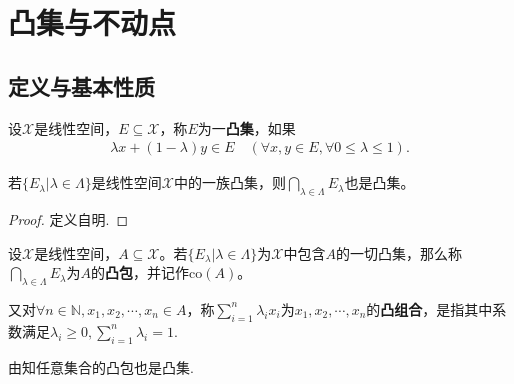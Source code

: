 \documentclass[../../main.tex]{subfiles}%
\begin{document}
\section{凸集与不动点}

\subsection{定义与基本性质}

\begin{definition}
设$\mathscr{X}$是线性空间，$E \subseteq \mathscr{X}$，称$E$为一\textbf{凸集}，如果
\begin{align*}
\lambda x + (1 - \lambda) y \in E \quad (\forall x, y \in E, \forall 0 \leqslant \lambda \leqslant 1).
\end{align*}
\end{definition}

\begin{proposition}\label{proposition:凸集任意交仍是凸集}
若$\{E_\lambda | \lambda \in \Lambda\}$是线性空间$\mathscr{X}$中的一族凸集，则$\bigcap\limits_{\lambda \in \Lambda} E_\lambda$也是凸集。
\end{proposition}
\begin{proof}
定义自明.
\end{proof}

\begin{definition}
设$\mathscr{X}$是线性空间，$A \subseteq \mathscr{X}$。若$\{E_\lambda | \lambda \in \Lambda\}$为$\mathscr{X}$中包含$A$的一切凸集，那么称$\bigcap\limits_{\lambda \in \Lambda} E_\lambda$为$A$的\textbf{凸包}，并记作$\mathrm{co}(A)$。

又对$\forall n \in \mathbb{N}, x_1, x_2, \cdots, x_n \in A$，称$\sum\limits_{i=1}^n \lambda_i x_i$为$x_1, x_2, \cdots, x_n$的\textbf{凸组合}，是指其中系数满足$\lambda_i \geqslant 0, \sum\limits_{i=1}^n \lambda_i = 1$.
\end{definition}
\begin{remark}
由知任意集合的凸包也是凸集.
\end{remark}
\end{document}
